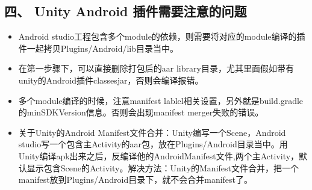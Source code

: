 \documentclass[9pt, b5paper]{article}
\begin{document}
\subsection{四、 Unity Android 插件需要注意的问题}
\label{sec-1-4}
\begin{itemize}
\item Android studio工程包含多个module的依赖，则需要将对应的module编译的插件一起拷贝Plugins/Android/lib目录当中。
\item 在第一步骤下，可以直接删除打包后的aar library目录，尤其里面假如带有unity的Android插件classesjar，否则会编译报错。
\item 多个module编译的时候，注意manifest lablel相关设置，另外就是build.gradle的minSDKVersion信息。否则会出现manifest merger失败的错误。
\item 关于Unity的Android Manifest文件合并：Unity编写一个Scene，Android studio写一个包含主Activity的aar包，放在Plugins/Android目录当中。用Unity编译apk出来之后，反编译他的AndroidManifest文件,两个主Activity，默认显示包含Scene的Activity。解决方法：Unity的Manifest文件合并，把一个manifest放到Plugins/Android目录下，就不会合并manifest了。
\end{itemize}
\end{document}
